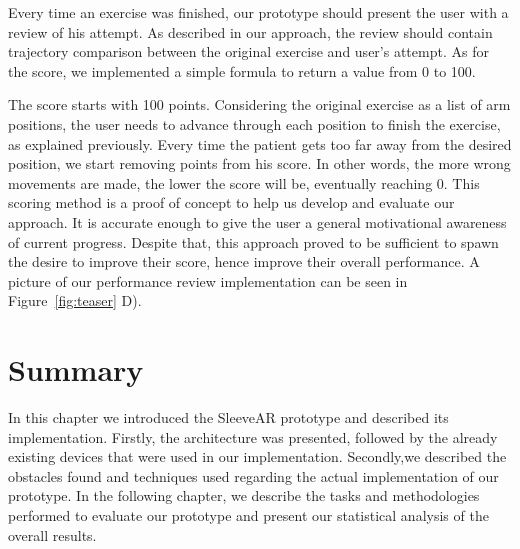 Every time an exercise was finished, our prototype should present the user with a review of his attempt. 
As described in our approach, the review should contain trajectory comparison between the original exercise and user's attempt.
As for the score, we implemented a simple formula to return a value from 0 to 100.

The score starts with 100 points.
Considering the original exercise as a list of arm positions, the user needs to advance through each position to finish the exercise, as explained previously. Every time the patient gets too far away from the desired position, we start removing points from his score. In other words, the more wrong movements are made, the lower the score will be, eventually reaching 0.
This scoring method is a proof of concept to help us develop and evaluate our approach. It is accurate enough to give the user a general motivational awareness of current progress.
Despite that, this approach proved to be sufficient to spawn the desire to improve their score, hence improve their overall performance.
A picture of our performance review implementation can be seen in Figure~\ref{fig:teaser} D).



\section{Summary}
In this chapter we introduced the SleeveAR prototype and described its implementation. Firstly, the architecture was presented, followed by the already existing devices that were used in our implementation. Secondly,we described the obstacles found and techniques used regarding the actual implementation of our prototype. In the following chapter, we describe the tasks and methodologies performed to evaluate our prototype and present our statistical analysis of the overall results.